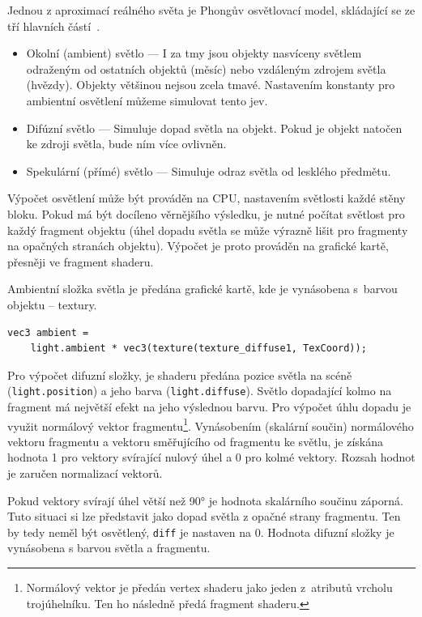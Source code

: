 \documentclass[thesis=M,czech]{FITthesis}[2019/12/23]
\begin{document}
Jednou z aproximací reálného světa je Phongův osvětlovací model, skládající se ze tří hlavních částí~\cite{lopgl_basic_light}.

\begin{itemize}
\item Okolní (ambient) světlo --- I za tmy jsou objekty nasvíceny světlem odraženým od ostatních objektů (měsíc) nebo vzdáleným zdrojem světla (hvězdy). Objekty většinou nejsou zcela tmavé. Nastavením konstanty pro ambientní osvětlení můžeme simulovat tento jev.

\item Difúzní světlo --- Simuluje dopad světla na objekt. Pokud je objekt natočen ke zdroji světla, bude ním více ovlivněn. 

\item Spekulární (přímé) světlo  --- Simuluje odraz světla od lesklého předmětu.
\end{itemize}

Výpočet osvětlení může být prováděn na CPU, nastavením světlosti každé stěny bloku. Pokud má být docíleno věrnějšího výsledku, je nutné počítat světlost pro každý fragment objektu (úhel dopadu světla se může výrazně lišit pro fragmenty na opačných stranách objektu). Výpočet je proto prováděn na grafické kartě, přesněji ve fragment shaderu.

Ambientní složka světla je předána grafické kartě, kde je vynásobena s~barvou objektu -- textury.

\begin{verbatim}
vec3 ambient = 
    light.ambient * vec3(texture(texture_diffuse1, TexCoord));
\end{verbatim}

Pro výpočet difuzní složky, je shaderu předána pozice světla na scéně (\texttt{light.position}) a jeho barva (\texttt{light.diffuse}). Světlo dopadající kolmo na fragment má nej\-vět\-ší efekt na jeho výslednou barvu. Pro výpočet úhlu dopadu je využit normálový vektor fragmentu\footnote{Normálový vektor je předán vertex shaderu jako jeden z~atributů vrcholu trojúhelníku. Ten ho následně předá fragment shaderu.}. Vynásobením (skalární součin) normálového vektoru fragmentu a vektoru směřujícího od fragmentu ke světlu, je získána hodnota 1 pro vektory svírající nulový úhel a 0 pro kolmé vektory. Rozsah hodnot je zaručen normalizací vektorů.

Pokud vektory svírají úhel větší než 90° je hodnota skalárního součinu záporná. Tuto situaci si lze představit jako dopad světla z opačné strany fragmentu. Ten by tedy neměl být osvětlený, \texttt{diff} je nastaven na 0. Hodnota difuzní složky je vynásobena s barvou světla a fragmentu.
\end{document}
